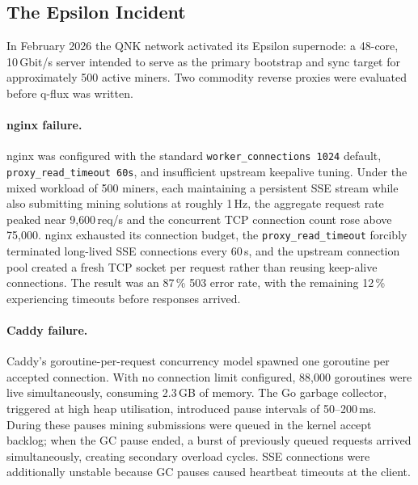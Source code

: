 \documentclass[a4paper, 11pt]{article}
\begin{document}
\subsection*{The Epsilon Incident}

In February 2026 the QNK network activated its Epsilon supernode: a 48-core,
10\,Gbit/s server intended to serve as the primary bootstrap and sync target for
approximately 500 active miners.  Two commodity reverse proxies were evaluated
before q-flux was written.

\paragraph{nginx failure.}  nginx was configured with the standard
\texttt{worker\_connections~1024} default, \texttt{proxy\_read\_timeout~60s}, and
insufficient upstream keepalive tuning.  Under the mixed workload of 500 miners,
each maintaining a persistent SSE stream while also submitting mining solutions at
roughly 1\,Hz, the aggregate request rate peaked near 9{,}600\,req/s and the
concurrent TCP connection count rose above 75{,}000.  nginx exhausted its
connection budget, the \texttt{proxy\_read\_timeout} forcibly terminated long-lived
SSE connections every 60\,s, and the upstream connection pool created a fresh TCP
socket per request rather than reusing keep-alive connections.  The result was an
87\,\% 503 error rate, with the remaining 12\,\% experiencing timeouts before
responses arrived.

\paragraph{Caddy failure.}  Caddy's goroutine-per-request concurrency model
spawned one goroutine per accepted connection.  With no connection limit
configured, 88{,}000 goroutines were live simultaneously, consuming 2.3\,GB of
memory.  The Go garbage collector, triggered at high heap utilisation, introduced
pause intervals of 50--200\,ms.  During these pauses mining submissions were
queued in the kernel accept backlog; when the GC pause ended, a burst of
previously queued requests arrived simultaneously, creating secondary overload
cycles.  SSE connections were additionally unstable because GC pauses caused
heartbeat timeouts at the client.
\end{document}
